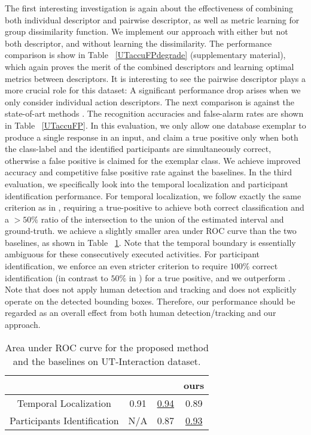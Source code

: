 The first interesting investigation is again about the effectiveness of combining both individual descriptor and pairwise descriptor, as well as metric learning for group dissimilarity function. We implement our approach with either but not both descriptor, and without learning the dissimilarity. The performance comparison is show in Table ~\ref{UTaccuFPdegrade} (supplementary material), which again proves the merit of the combined descriptors and learning optimal metrics between descriptors. It is interesting to see the pairwise descriptor plays a more crucial role for this dataset: A significant performance drop arises when we only consider individual action descriptors. The next comparison is against the state-of-art methods \cite{Ryoo:group,Amer:group}. The recognition accuracies and false-alarm rates are shown in Table ~\ref{UTaccuFP}. In this evaluation, we only allow one database exemplar to produce a single response in an input, and claim a true positive only when both the class-label and the identified participants are simultaneously correct, otherwise a false positive is claimed for the exemplar class. We achieve improved accuracy and competitive false positive rate against the baselines. In the third evaluation, we specifically look into the temporal localization and participant identification performance. For temporal localization, we follow exactly the same criterion as in \cite{Amer:group}, requiring a true-positive to achieve both correct classification and a $>50\%$ ratio of the intersection to the union of the estimated interval and ground-truth. we achieve a slightly smaller area under ROC curve than the two baselines, as shown in Table ~\ref{UTarea}. Note that the temporal boundary is essentially ambiguous for these consecutively executed activities. For participant identification, we enforce an even stricter criterion to require $100\%$ correct identification (in contrast to $50\%$ in \cite{Amer:group}) for a true positive, and we outperform \cite{Amer:group}. Note that \cite{Ryoo:group} does not apply human detection and tracking and \cite{Amer:group} does not explicitly operate on the detected bounding boxes. Therefore, our performance should be regarded as an overall effect from both human detection/tracking and our approach.

\begin{table}[ht]
\centering \caption{Area under ROC curve for the proposed method and the baselines on UT-Interaction dataset.}
\footnotesize{
\begin{tabular}{|c|c|c|c|}
\hline   & \cite{Ryoo:group} &  \cite{Amer:group}  &   ours \\
\hline Temporal Localization &  0.91 & \underline{0.94} &  0.89\\
\hline Participants Identification &  N/A & 0.87 &  \underline{0.93}   \\
\hline 
\end{tabular}
}
\label{UTarea}
\end{table}

